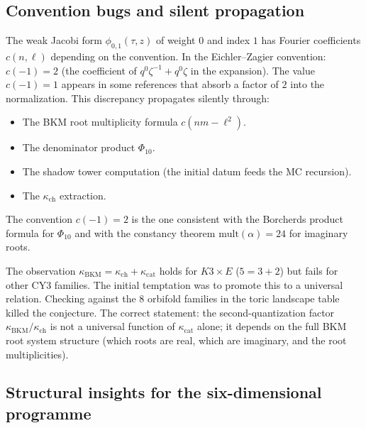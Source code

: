 \documentclass[11pt]{article}
\newcommand{\mult}{\mathrm{mult}}
\begin{document}
\subsection{Convention bugs and silent propagation}
\label{subsec:convention-bugs}

\begin{warning}[The $\phi_{0,1}$ normalization: $c(-1) = 2$ not $1$]
\label{warn:phi01-normalization}
The weak Jacobi form $\phi_{0,1}(\tau, z)$ of weight $0$ and index $1$
has Fourier coefficients $c(n, \ell)$ depending on the convention.
In the Eichler--Zagier convention: $c(-1) = 2$ (the coefficient of
$q^0 \zeta^{-1} + q^0 \zeta$ in the expansion). The value $c(-1) = 1$
appears in some references that absorb a factor of $2$ into the
normalization. This discrepancy propagates silently through:
\begin{itemize}
 \item The BKM root multiplicity formula $c(nm - \ell^2)$.
 \item The denominator product $\Phi_{10}$.
 \item The shadow tower computation (the initial datum feeds the
 MC recursion).
 \item The $\kappa_{\mathrm{ch}}$ extraction.
\end{itemize}
The convention $c(-1) = 2$ is the one consistent with the Borcherds
product formula for $\Phi_{10}$ and with the constancy theorem
$\mult(\alpha) = 24$ for imaginary roots.
\end{warning}

\begin{warning}
\label{warn:kbkm-universal}
The observation $\kappa_{\mathrm{BKM}} = \kappa_{\mathrm{ch}} + \kappa_{\mathrm{cat}}$
holds for $K3 \times E$ ($5 = 3 + 2$) but fails for other CY3 families.
The initial temptation was to promote this to a universal relation.
Checking against the $8$ orbifold families in the toric landscape
table killed the conjecture. The correct statement: the second-quantization
factor $\kappa_{\mathrm{BKM}} / \kappa_{\mathrm{ch}}$ is not a universal
function of $\kappa_{\mathrm{cat}}$ alone; it depends on the full
BKM root system structure (which roots are real, which are imaginary,
and the root multiplicities).
\end{warning}

\subsection{Structural insights for the six-dimensional programme}
\label{subsec:6d-structural}
\end{document}
